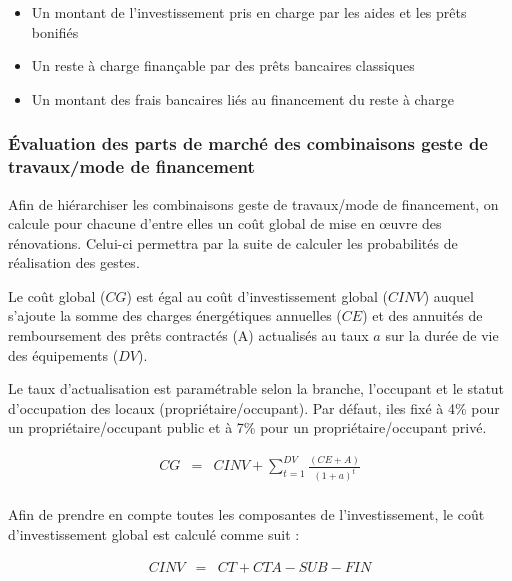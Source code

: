 \documentclass[10.5pt,a4paper]{article}
\begin{document}
{\begin{itemize} 
\item Un montant de l’investissement pris en charge par les aides et les prêts bonifiés
\item Un reste à charge finançable par des prêts bancaires classiques
\item Un montant des frais bancaires liés au financement du reste à charge
\end{itemize}



\subsubsection{Évaluation des parts de marché des combinaisons geste de travaux/mode de financement}

Afin de hiérarchiser les combinaisons geste de travaux/mode de financement, on calcule pour chacune d'entre elles un coût global de mise en œuvre des rénovations. Celui-ci permettra par la suite de calculer les probabilités de réalisation des gestes.

Le coût global ($CG$) est égal au coût d’investissement global ($CINV$) auquel s’ajoute la somme des charges énergétiques annuelles ($CE$) et des annuités de remboursement des prêts contractés (A) actualisés au taux $a$ sur la durée de vie des équipements ($DV$). 

Le taux d’actualisation est paramétrable selon la branche, l’occupant et le statut d’occupation des locaux (propriétaire/occupant). Par défaut, iles fixé à 4\% pour un propriétaire/occupant public et à 7\% pour un propriétaire/occupant privé. 

\begin{eqnarray}
 CG &= & CINV + \sum_{t = 1}^{DV} \frac{(CE + A)}{(1+a)^t}  \\
\end{eqnarray}

Afin de prendre en compte toutes les composantes de l’investissement, le coût d’investissement global est calculé comme suit :

\begin{eqnarray}
 CINV &= & CT + CTA - SUB - FIN  \\
\end{eqnarray}

}
\end{document}
